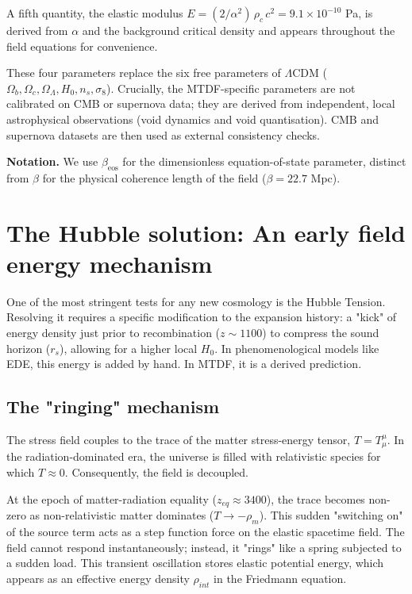 \documentclass[11pt,a4paper]{article}
\begin{document}
A fifth quantity, the elastic modulus $E = (2/\alpha^2)\,\rho_c\,c^2 = 9.1 \times 10^{-10}$ Pa, is derived from $\alpha$ and the background critical density and appears throughout the field equations for convenience.

These four parameters replace the six free parameters of $\Lambda$CDM ($\Omega_b, \Omega_c, \Omega_\Lambda, H_0, n_s, \sigma_8$). Crucially, the MTDF-specific parameters are not calibrated on CMB or supernova data; they are derived from independent, local astrophysical observations (void dynamics and void quantisation). CMB and supernova datasets are then used as external consistency checks.

\textbf{Notation.} We use $\beta_\text{eos}$ for the dimensionless equation-of-state parameter, distinct from $\beta$ for the physical coherence length of the field ($\beta = 22.7$ Mpc).

\section{The Hubble solution: An early field energy mechanism}
\label{sec:sec5}
One of the most stringent tests for any new cosmology is the Hubble Tension. Resolving it requires a specific modification to the expansion history: a "kick" of energy density just prior to recombination ($z \sim 1100$) to compress the sound horizon ($r_s$), allowing for a higher local $H_0$. In phenomenological models like EDE, this energy is added by hand. In MTDF, it is a derived prediction.

\subsection{The "ringing" mechanism}
The stress field couples to the trace of the matter stress-energy tensor, $T = T^\mu_\mu$. In the radiation-dominated era, the universe is filled with relativistic species for which $T \approx 0$. Consequently, the field is decoupled.

At the epoch of matter-radiation equality ($z_{eq} \approx 3400$), the trace becomes non-zero as non-relativistic matter dominates ($T \to -\rho_m$). This sudden "switching on" of the source term acts as a step function force on the elastic spacetime field. The field cannot respond instantaneously; instead, it "rings" like a spring subjected to a sudden load. This transient oscillation stores elastic potential energy, which appears as an effective energy density $\rho_{int}$ in the Friedmann equation.
\end{document}
